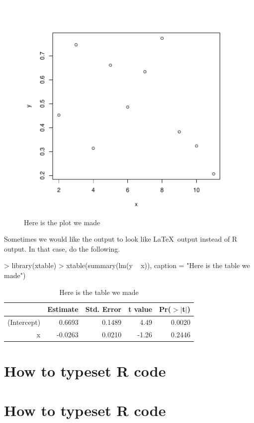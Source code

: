 \documentclass[12pt]{article}         %
\begin{document}
\begin{figure}
\includegraphics{coursework-007}
\caption{Here is the plot we made}
\end{figure}


Sometimes we would like the output to look like \LaTeX\ output instead of \textsf{R} output.  In that case, do the following.

\begin{Schunk}
\begin{Sinput}
> library(xtable)
> xtable(summary(lm(y ~ x)), caption = "Here is the table we made")
\end{Sinput}
\begin{table}[ht]
\centering
\begin{tabular}{rrrrr}
  \hline
 & Estimate & Std. Error & t value & Pr($>$$|$t$|$) \\ 
  \hline
(Intercept) & 0.6693 & 0.1489 & 4.49 & 0.0020 \\ 
  x & -0.0263 & 0.0210 & -1.26 & 0.2446 \\ 
   \hline
\end{tabular}
\caption{Here is the table we made} 
\end{table}\end{Schunk}

\pagebreak 
\section{How to typeset \textsf{R} code}
\pagebreak 
\section{How to typeset \textsf{R} code}
\end{document}
